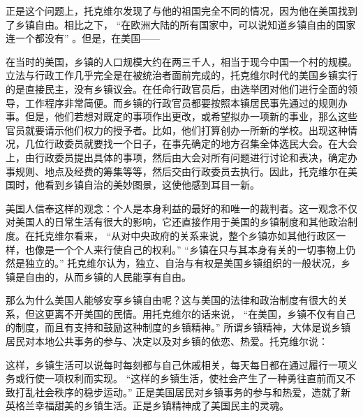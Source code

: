 正是这个问题上，托克维尔发现了与他的祖国完全不同的情况，因为他在美国找到了乡镇自由。相比之下， “在欧洲大陆的所有国家中，可以说知道乡镇自由的国家连一个都没有” 。但是，在美国——


在当时的美国，乡镇的人口规模大约在两三千人，相当于现今中国一个村的规模。立法与行政工作几乎完全是在被统治者面前完成的，托克维尔时代的美国乡镇实行的是直接民主，没有乡镇议会。在任命行政官员后，由选举团对他们进行全面的领导，工作程序非常简便。而乡镇的行政官员都要按照本镇居民事先通过的规则办事。但是，他们若想对既定的事项作出更改，或希望拟办一项新的事业，那么这些官员就要请示他们权力的授予者。比如，他们打算创办一所新的学校。出现这种情况，几位行政委员就要找一个日子，在事先确定的地方召集全体选民大会。在大会上，由行政委员提出具体的事项，然后由大会对所有问题进行讨论和表决，确定办事规则、地点及经费的筹集等等，然后交由行政委员去执行。因此，托克维尔在美国时，他看到乡镇自治的美妙图景，这使他感到耳目一新。

美国人信奉这样的观念：个人是本身利益的最好的和唯一的裁判者。这一观念不仅对美国人的日常生活有很大的影响，它还直接作用于美国的乡镇制度和其他政治制度。在托克维尔看来， “从对中央政府的关系来说，整个乡镇亦如其他行政区一样，也像是一个个人来行使自己的权利。”  “乡镇在只与其本身有关的一切事物上仍然是独立的。” 托克维尔认为，独立、自治与有权是美国乡镇组织的一般状况，乡镇是自由的，从而乡镇的人民能享有自由。

那么为什么美国人能够安享乡镇自由呢？这与美国的法律和政治制度有很大的关系，但这更离不开美国的民情。用托克维尔的话来说， “在美国，乡镇不仅有自己的制度，而且有支持和鼓励这种制度的乡镇精神。” 所谓乡镇精神，大体是说乡镇居民对本地公共事务的参与、决定以及对乡镇的依恋、热爱。托克维尔说：


这样，乡镇生活可以说每时每刻都与自己休戚相关，每天每日都在通过履行一项义务或行使一项权利而实现。 “这样的乡镇生活，使社会产生了一种勇往直前而又不致打乱社会秩序的稳步运动。” 正是美国居民对乡镇事务的参与和热爱，造就了新英格兰幸福甜美的乡镇生活。正是乡镇精神成了美国民主的灵魂。

